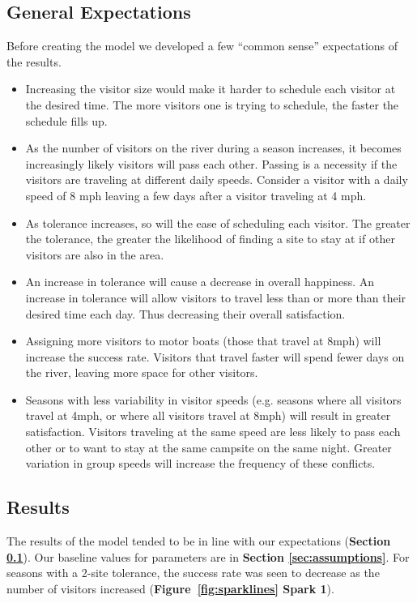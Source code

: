 \documentclass[11pt]{article} %
\begin{document}
\subsection{General Expectations}
\label{sec:expectations}
Before creating the model we developed a few ``common sense'' expectations of
the results.
\begin{itemize}
\item Increasing the visitor size
would make it harder to schedule each visitor at the desired time. The more
visitors one is trying to schedule, the faster the schedule fills up.

\item As the number of visitors on the river during a season increases, it
becomes increasingly likely visitors will pass each other. Passing
is a necessity if the visitors are traveling at different daily
speeds.  Consider a visitor with a daily speed of 8 mph leaving a few days
after a visitor traveling at 4 mph.

\item As tolerance increases, so will the ease of scheduling each visitor. The
greater the tolerance, the greater the likelihood of finding a site to stay
at if other visitors are also in the area.

\item An increase in tolerance will cause a decrease in overall happiness.
An increase in tolerance will allow visitors to travel less than or more
than their desired time each day. Thus decreasing their overall satisfaction.

\item Assigning more visitors to motor boats (those that travel
at 8mph) will increase the success rate. Visitors that travel faster will
spend fewer days on the river, leaving more space for other visitors.

\item Seasons with less variability in visitor speeds (e.g. seasons where
all visitors travel at 4mph, or where all visitors travel at 8mph) will result
in greater satisfaction. Visitors traveling at the same speed are less likely
to pass each other or to want to stay at the same campsite on the same night.
Greater variation in group speeds will increase the frequency of these
conflicts.
\end{itemize}

\subsection{Results}
\label{sec:results}
The results of the model tended to be in line with our
expectations (\textbf{Section \ref{sec:expectations}}). Our baseline
values for parameters are in \textbf{Section \ref{sec:assumptions}}.
For seasons with a
2-site tolerance, the success rate
was seen to decrease as the number of visitors increased
(\textbf{Figure~\ref{fig:sparklines} Spark 1}).
\end{document}
